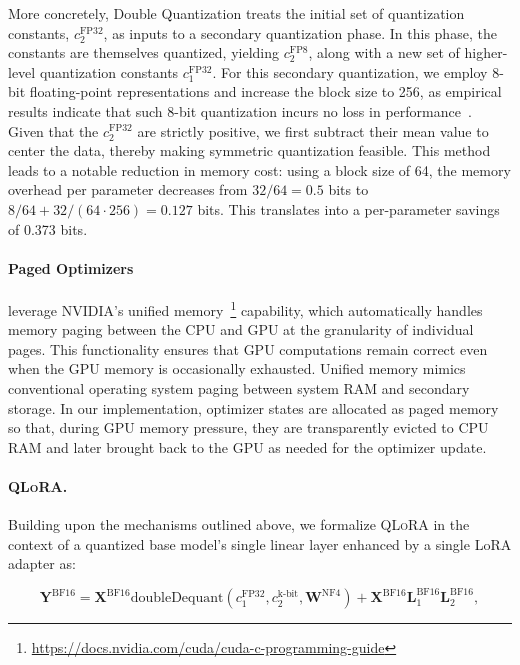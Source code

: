 More concretely, Double Quantization treats the initial set of quantization constants, $c_2^{\text{FP32}}$, as inputs to a secondary quantization phase. In this phase, the constants are themselves quantized, yielding $c_2^{\text{FP8}}$, along with a new set of higher-level quantization constants $c_1^{\text{FP32}}$. For this secondary quantization, we employ 8-bit floating-point representations and increase the block size to 256, as empirical results indicate that such 8-bit quantization incurs no loss in performance~\citep{dettmers2022case}. 
Given that the $c_2^{\text{FP32}}$ are strictly positive, we first subtract their mean value to center the data, thereby making symmetric quantization feasible. This method leads to a notable reduction in memory cost: using a block size of 64, the memory overhead per parameter decreases from $32/64=0.5$ bits to $8/64 + 32/(64\cdot256) = 0.127$ bits. This translates into a per-parameter savings of 0.373 bits.

\paragraph{Paged Optimizers} leverage NVIDIA’s unified memory~\footnote{\tiny \url{https://docs.nvidia.com/cuda/cuda-c-programming-guide}} capability, which automatically handles memory paging between the CPU and GPU at the granularity of individual pages. This functionality ensures that GPU computations remain correct even when the GPU memory is occasionally exhausted. Unified memory mimics conventional operating system paging between system RAM and secondary storage. In our implementation, optimizer states are allocated as paged memory so that, during GPU memory pressure, they are transparently evicted to CPU RAM and later brought back to the GPU as needed for the optimizer update.

\paragraph{\textsc{QLoRA}.} Building upon the mechanisms outlined above, we formalize \textsc{QLoRA} in the context of a quantized base model’s single linear layer enhanced by a single LoRA adapter as:

\begin{equation}
    \mathbf{Y}^{\text{BF16}} =  \mathbf{X}^{\text{BF16}} \text{doubleDequant}(c_1^{\text{FP32}}, c_2^{\text{k-bit}}, \mathbf{W}^{\text{NF4}}) + \mathbf{X}^{\text{BF16}}\mathbf{L}^{\text{BF16}}_1\mathbf{L}^{\text{BF16}}_2,
\end{equation}

